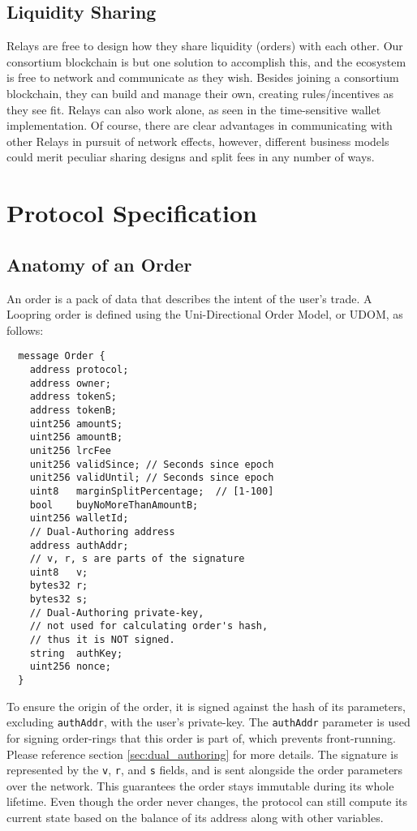 \documentclass[UTF8,nofonts]{article}
\begin{document}
\begin{multicols}{2}
\subsection{Liquidity Sharing\label{sec:liquidity_sharing}}
Relays are free to design how they share liquidity (orders) with each other. Our consortium blockchain is but one solution to accomplish this, and the ecosystem is free to network and communicate as they wish. Besides joining a consortium blockchain, they can build and manage their own, creating rules/incentives as they see fit. Relays can also work alone, as seen in the time-sensitive wallet implementation. Of course, there are clear advantages in communicating with other Relays in pursuit of network effects, however, different business models could merit peculiar sharing designs and split fees in any number of ways.


\section{Protocol Specification\label{sec:protocol}}

\subsection{Anatomy of an Order\label{anatomy}}
An order is a pack of data that describes the intent of the user's trade. A Loopring order is defined using the Uni-Directional Order Model, or UDOM, as follows:

\begin{verbatim}
  message Order {
    address protocol;
    address owner;
    address tokenS;
    address tokenB;
    uint256 amountS;
    uint256 amountB;
    unit256 lrcFee
    unit256 validSince; // Seconds since epoch
    unit256 validUntil; // Seconds since epoch
    uint8   marginSplitPercentage;  // [1-100]
    bool    buyNoMoreThanAmountB;
    uint256 walletId;
    // Dual-Authoring address
    address authAddr;
   	// v, r, s are parts of the signature
    uint8   v;       
    bytes32 r;
    bytes32 s;
    // Dual-Authoring private-key,
    // not used for calculating order's hash,
    // thus it is NOT signed.
    string  authKey;          
    uint256 nonce;
  }
\end{verbatim}


To ensure the origin of the order, it is signed against the hash of its parameters, excluding \verb|authAddr|, with the user's private-key. The \verb|authAddr| parameter is used for signing  order-rings that this order is part of, which prevents front-running. Please reference section \ref{sec:dual_authoring} for more details. The signature is represented by the \verb|v|, \verb|r|, and \verb|s| fields, and is sent alongside the order parameters over the network. This guarantees the order stays immutable during its whole lifetime. Even though the order never changes, the protocol can still compute its current state based on the balance of its address along with other variables.




\end{multicols}
\end{document}
